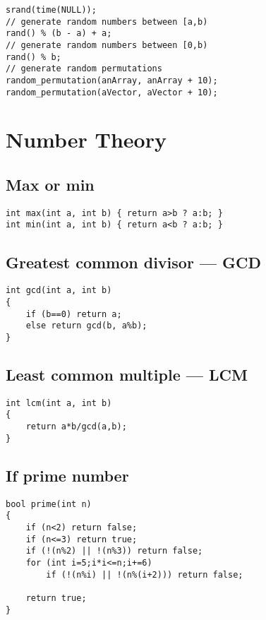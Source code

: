 \documentclass[a4paper]{article}
\begin{document}
\begin{verbatim}
srand(time(NULL));
// generate random numbers between [a,b)
rand() % (b - a) + a;
// generate random numbers between [0,b)
rand() % b; 
// generate random permutations
random_permutation(anArray, anArray + 10);
random_permutation(aVector, aVector + 10);
\end{verbatim}
	
\section{Number Theory}

\subsection{Max or min}
\begin{verbatim}
int max(int a, int b) { return a>b ? a:b; }
int min(int a, int b) { return a<b ? a:b; }
\end{verbatim}

\subsection{Greatest common divisor --- GCD}

\begin{verbatim}
int gcd(int a, int b)
{
	if (b==0) return a;
	else return gcd(b, a%b);
}
\end{verbatim}

\subsection{Least common multiple --- LCM}

\begin{verbatim}
int lcm(int a, int b)
{
	return a*b/gcd(a,b);
}
\end{verbatim}

\subsection{If prime number}

\begin{verbatim}
bool prime(int n)
{
	if (n<2) return false;
	if (n<=3) return true;
	if (!(n%2) || !(n%3)) return false;
	for (int i=5;i*i<=n;i+=6)
		if (!(n%i) || !(n%(i+2))) return false;
		
	return true;
}
\end{verbatim}
\end{document}
